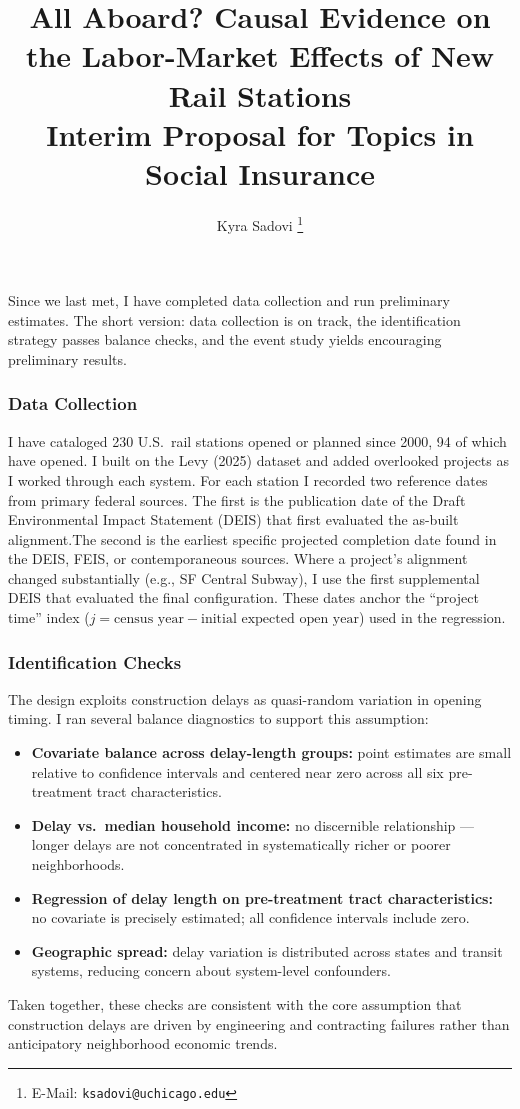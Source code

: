 \documentclass[12pt]{article}
\title{\textbf{All Aboard? Causal Evidence on the Labor-Market Effects of New Rail Stations}\\ \medskip
\large Interim Proposal for Topics in Social Insurance}
\author{Kyra Sadovi%
  \thanks{E-Mail: \texttt{ksadovi@uchicago.edu}}}
\affil{Harris School of Public Policy, University of Chicago}
\date{}
\begin{document}
\noindent Since we last met, I have completed data collection and run preliminary estimates. The short version: data collection is on track, the identification strategy passes balance checks, and the event study yields encouraging preliminary results.

\subsubsection*{Data Collection}
I have cataloged 230 U.S.\ rail stations opened or planned since 2000, 94 of which have opened. I built on the Levy (2025) dataset and added overlooked projects as I worked through each system. For each station I recorded two reference dates from primary federal sources. The first is the publication date of the Draft Environmental Impact Statement (DEIS) that first evaluated the as-built alignment.The second is the earliest specific projected completion date found in the DEIS, FEIS, or contemporaneous sources. Where a project's alignment changed substantially (e.g., SF Central Subway), I use the first supplemental DEIS that evaluated the final configuration. These dates anchor the ``project time'' index ($j = \text{census year} - \text{initial expected open year}$) used in the regression.

\subsubsection*{Identification Checks}

The design exploits construction delays as quasi-random variation in opening timing. I ran several balance diagnostics to support this assumption:
\begin{itemize}
  \item \textbf{Covariate balance across delay-length groups:} point estimates are small relative to confidence intervals and centered near zero across all six pre-treatment tract characteristics.
  \item \textbf{Delay vs.\ median household income:} no discernible relationship --- longer delays are not concentrated in systematically richer or poorer neighborhoods.
  \item \textbf{Regression of delay length on pre-treatment tract characteristics:} no covariate is precisely estimated; all confidence intervals include zero.
  \item \textbf{Geographic spread:} delay variation is distributed across states and transit systems, reducing concern about system-level confounders.
\end{itemize}
Taken together, these checks are consistent with the core assumption that construction delays are driven by engineering and contracting failures rather than anticipatory neighborhood economic trends.
\end{document}
